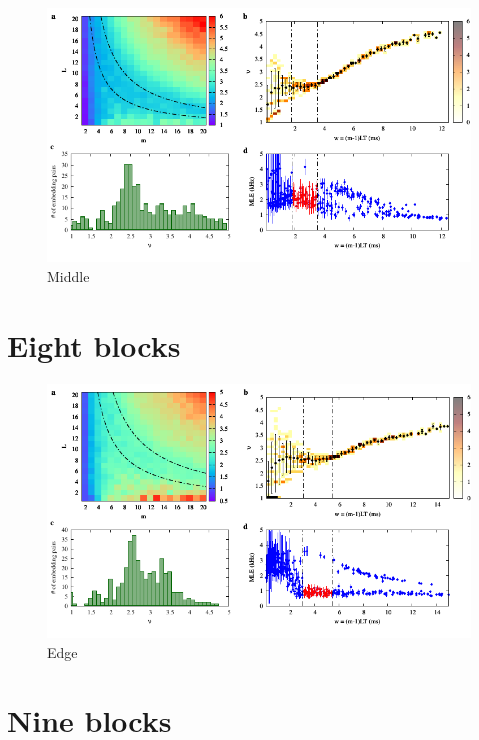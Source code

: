 \begin{figure}[H]
    \centering
    \includegraphics[width=\linewidth]{../7_blocks/middle/2e5_points/plots/chaos_low.pdf}
    \caption{Middle}
    \label{fig:7 blocks chaos middle}
\end{figure}

\section{Eight blocks}

\begin{figure}[H]
    \centering
    \includegraphics[width=\linewidth]{../8_blocks/2e5_points/plots/chaos_low.pdf}
    \caption{Edge}
    \label{fig:8 blocks chaos}
\end{figure}

\section{Nine blocks}

